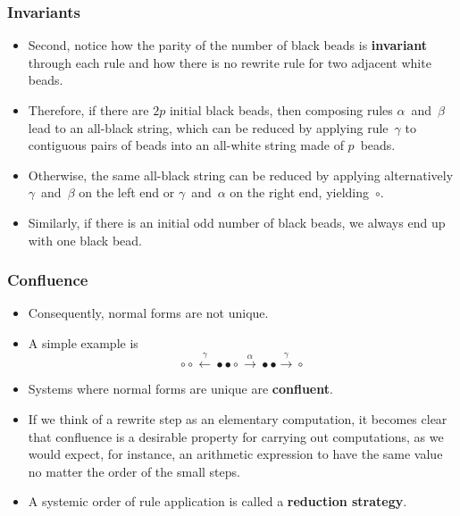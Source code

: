 \documentclass[compress,dvips,xcolor={dvipsnames},t]{beamer}
\begin{document}
\begin{frame}
  \frametitle{Invariants}

  \begin{itemize}

    \item Second, notice how the parity of the number of black beads
      is \textbf{invariant} through each rule and how there is no
      rewrite rule for two adjacent white beads.

    \item Therefore, if there are \(2p\) initial black beads, then
      composing rules \(\alpha\)~and~\(\beta\) lead to an
      all\hyp{}black string, which can be reduced by applying
      rule~\(\gamma\) to contiguous pairs of beads into an
      all\hyp{}white string made of \(p\)~beads.

    \item Otherwise, the same all\hyp{}black string can be reduced by
      applying alternatively \(\gamma\)~and~\(\beta\) on the left end
      or \(\gamma\)~and~\(\alpha\) on the right end,
      yielding~\(\circ\).

    \item Similarly, if there is an initial odd number of black beads,
      we always end up with one black bead.

  \end{itemize}

\end{frame}

\begin{frame}
  \frametitle{Confluence}

  \begin{itemize}

    \item Consequently, normal forms are not unique.

    \item A simple example is
      \begin{equation*}
        \circ \circ \xleftarrow{\gamma} \bullet \bullet \circ
        \xrightarrow{\alpha} \bullet \bullet \xrightarrow{\gamma}
        \circ
      \end{equation*}

    \item Systems where normal forms are unique are
      \textbf{confluent}.

    \item If we think of a rewrite step as an elementary computation,
      it becomes clear that confluence is a desirable property for
      carrying out computations, as we would expect, for instance, an
      arithmetic expression to have the same value no matter the order
      of the small steps.

    \item A systemic order of rule application is called a
      \textbf{reduction strategy}.

  \end{itemize}

\end{frame}
\end{document}
